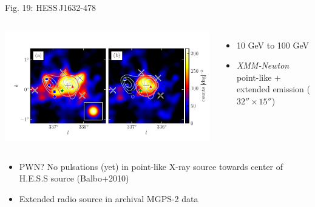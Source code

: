 \documentclass[12pt]{beamer}
\begin{document}
\begin{frame}{Fig. 19: HESS\,J1632-478}
  \begin{columns}
    \includegraphics[scale=0.5]{plots/source_HESS_J1632-478_color.pdf}
    \begin{itemize}
      \item 10 GeV to 100 GeV
      \item  {\em XMM-Newton} point-like + extended emission
        ($32''\times15''$)
    \end{itemize}
  \end{columns}

  \begin{itemize}
      \item PWN? No pulsations (yet) in point-like X-ray source
        towards center of H.E.S.S source (Balbo+2010)
      \item Extended radio source in archival MGPS-2 data
    \end{itemize}

\end{frame}
\end{document}
